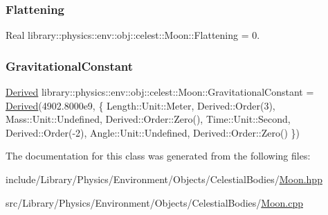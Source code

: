 \subsubsection{\texorpdfstring{Flattening}{Flattening}}
{\footnotesize\ttfamily Real library\+::physics\+::env\+::obj\+::celest\+::\+Moon\+::\+Flattening = 0.\hspace{0.3cm}{\ttfamily [static]}}

\mbox{\label{classlibrary_1_1physics_1_1env_1_1obj_1_1celest_1_1_moon_aee16207c53ac86140c994da72cce64d2}} 
\subsubsection{\texorpdfstring{Gravitational\+Constant}{GravitationalConstant}}
{\footnotesize\ttfamily \hyperlink{classlibrary_1_1physics_1_1units_1_1_derived}{Derived} library\+::physics\+::env\+::obj\+::celest\+::\+Moon\+::\+Gravitational\+Constant = \hyperlink{classlibrary_1_1physics_1_1units_1_1_derived}{Derived}(4902.\+8000e9, \{ Length\+::\+Unit\+::\+Meter, Derived\+::\+Order(3), Mass\+::\+Unit\+::\+Undefined, Derived\+::\+Order\+::\+Zero(), Time\+::\+Unit\+::\+Second, Derived\+::\+Order(-\/2), Angle\+::\+Unit\+::\+Undefined, Derived\+::\+Order\+::\+Zero() \})\hspace{0.3cm}{\ttfamily [static]}}



The documentation for this class was generated from the following files\+:\begin{DoxyCompactItemize}
\item 
include/\+Library/\+Physics/\+Environment/\+Objects/\+Celestial\+Bodies/\hyperlink{_moon_8hpp}{Moon.\+hpp}\item 
src/\+Library/\+Physics/\+Environment/\+Objects/\+Celestial\+Bodies/\hyperlink{_moon_8cpp}{Moon.\+cpp}\end{DoxyCompactItemize}
